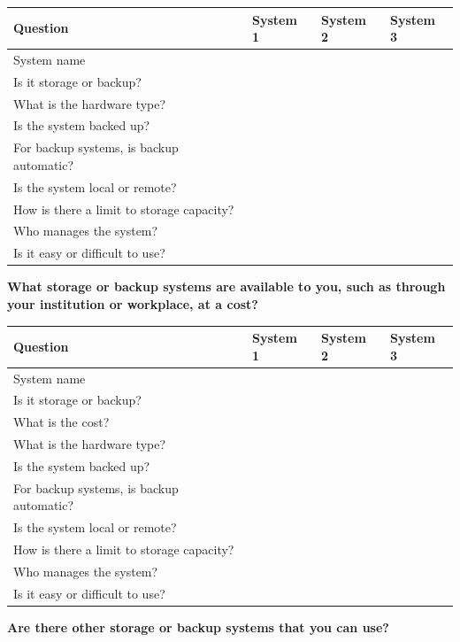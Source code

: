 \documentclass[
]{book}
\begin{document}
\begin{tabular}{l|l|l|l}
\hline
Question & System 1 & System 2 & System 3\\
\hline
System name &  &  & \\
\hline
Is it storage or backup? &  &  & \\
\hline
What is the hardware type? &  &  & \\
\hline
Is the system backed up? &  &  & \\
\hline
For backup systems, is backup automatic? &  &  & \\
\hline
Is the system local or remote? &  &  & \\
\hline
How is there a limit to storage capacity? &  &  & \\
\hline
Who manages the system? &  &  & \\
\hline
Is it easy or difficult to use? &  &  & \\
\hline
\end{tabular}

\textbf{What storage or backup systems are available to you, such as through your institution or workplace, at a cost?}

\begin{tabular}{l|l|l|l}
\hline
Question & System 1 & System 2 & System 3\\
\hline
System name &  &  & \\
\hline
Is it storage or backup? &  &  & \\
\hline
What is the cost? &  &  & \\
\hline
What is the hardware type? &  &  & \\
\hline
Is the system backed up? &  &  & \\
\hline
For backup systems, is backup automatic? &  &  & \\
\hline
Is the system local or remote? &  &  & \\
\hline
How is there a limit to storage capacity? &  &  & \\
\hline
Who manages the system? &  &  & \\
\hline
Is it easy or difficult to use? &  &  & \\
\hline
\end{tabular}

\textbf{Are there other storage or backup systems that you can use? }
\end{document}
